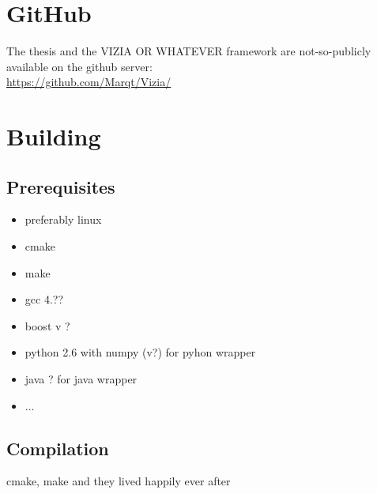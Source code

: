 
\chapter{GitHub}
The thesis and the VIZIA OR WHATEVER framework are not-so-publicly available on the github server: \\
\url{https://github.com/Marqt/Vizia/} 

\chapter{Building}
\section{Prerequisites}
\begin{itemize}
\item preferably linux
\item cmake
\item make
\item gcc 4.??
\item boost v ?
\item python 2.6 with numpy (v?) for pyhon wrapper
\item java ? for java wrapper
\item ...
\end{itemize}
\section{Compilation}
cmake, make and they lived happily ever after
